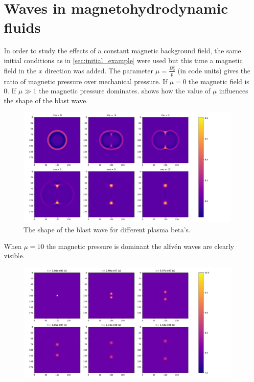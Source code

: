 \documentclass{article}
\begin{document}
\section{Waves in magnetohydrodynamic fluids} \label{sec:waves_in_magnetorhydrodynamic_fluids}
In order to study the effects of a constant magnetic background field, the same initial conditions as in \cref{sec:initial_example} were used but this time a magnetic field in the $x$ direction was added.
The parameter $\mu = \frac{B_0^2}{p}$ (in code units) gives the ratio of magnetic pressure over mechanical pressure. If $\mu = 0$ the magnetic field is $0$. If $\mu \gg 1$ the magnetic pressure dominates. 
 shows how the value of $\mu$ influences the shape of the blast wave.
\begin{figure}[h]
	\centering
	\includegraphics[width = \linewidth]{figures/influence_mu.pdf}
	\caption{The shape of the blast wave for different plasma beta's.}
\label{fig:blastwave_shape_mu}
\end{figure}

When $\mu  = 10$ the magnetic pressure is dominant the alfv\'en waves are clearly visible.

\begin{figure}[h]
	\centering
	\includegraphics[width=\textwidth]{figures/alven_wave.pdf}
	\caption{}
	\label{fig:Alfven_wave}
\end{figure}
\end{document}
